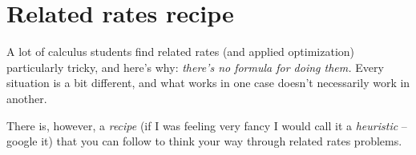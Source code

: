 
\usetikzlibrary{shapes.geometric}


%


\allowdisplaybreaks
\section{Related rates recipe}
A lot of calculus students find related rates (and applied optimization) particularly tricky, and here's why: \textit{there's no formula for doing them.} Every situation is a bit different, and what works in one case doesn't necessarily work in another.

There is, however, a \textit{recipe} (if I was feeling very fancy I would call it a \textit{heuristic} -- google it) that you can follow to think your way through related rates problems.

